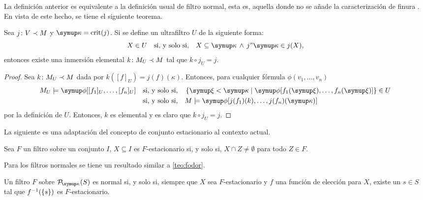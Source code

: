 \documentclass
[
  12pt,
  letterpaper,
  openany,
  oneside,
]{book}
\begin{document}
La definición anterior es equivalente \autocite[Ejercicio 22.5]{kanamori_higher_2009}
a la definición usual de filtro normal, esta es, aquella donde no se añade
la caracterización de finura \autocite[52]{kanamori_higher_2009}.
En vista de este hecho, se tiene el siguiente teorema.

\begin{teo}\label{teo:exists-k}
    Sea $j\colon V\prec M$ y $\kappa=\crit{j}$. Si se define un ultrafiltro $U$
    de la siguiente forma:
    \[
        X\in U\quad\text{si, y solo si,}\quad X\subseteq \kappa \,\land\, j"\kappa\in j(X),
    \]
    entonces existe una inmersión elemental $k\colon M_U\prec M$ tal que $k\circ j_U = j$.
\end{teo}

\begin{proof}
    Sea $k\colon M_U\prec M$ dada por $k([f]_U)=j(f)(\kappa)$. Entonces, para
    cualquier fórmula $\phi(v_1,\dots,v_n)$
    \begin{align*}
        M_U \models\phi[[f_1]_U,\dots,[f_n]_U]
        &\quad\text{si, y solo si,}\quad
        \set{\xi<\kappa\mid\phi[f_1(\xi),\dots,f_n(\xi)]} \in U \\
        &\quad\text{si, y solo si,}\quad
        M \models \phi[j(f_1)(k),\dots,j(f_n)(\kappa)]
    \end{align*}
    por la definición de $U$. Entonces, $k$ es elemental y es claro que $k\circ j_U=j$.
\end{proof}

La siguiente es una adaptación del concepto de conjunto estacionario al
contexto actual.

\begin{defi}
    Sea $F$ un filtro sobre un conjunto $I$, $X\subseteq I$ es $F$-estacionario si, y solo si,
    $X\cap Z\neq\emptyset$ para todo $Z\in F$.
\end{defi}

Para los filtros normales se tiene un resultado similar a \ref{teo:fodor}.

\begin{teo}\label{teo:normal-fodor}
    Un filtro $F$ sobre $\pwset[\kappa]{S}$ es normal si, y solo si,
    siempre que $X$ sea $F$-estacionario y $f$ una función de elección para $X$,
    existe un $s\in S$ tal que $f^{-1}(\left\{ s \right\})$ es $F$-estacionario.
\end{teo}
\end{document}
